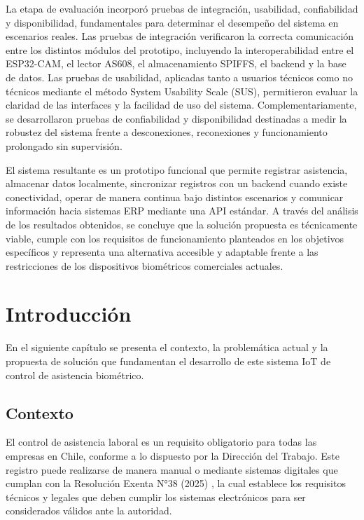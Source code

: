 \documentclass{iccmemoria}
\begin{document}
\begin{resumen}
La etapa de evaluación incorporó pruebas de integración, usabilidad, confiabilidad y disponibilidad, fundamentales para determinar el desempeño del sistema en escenarios reales. Las pruebas de integración verificaron la correcta comunicación entre los distintos módulos del prototipo, incluyendo la interoperabilidad entre el ESP32-CAM, el lector AS608, el almacenamiento SPIFFS, el backend y la base de datos. Las pruebas de usabilidad, aplicadas tanto a usuarios técnicos como no técnicos mediante el método System Usability Scale (SUS), permitieron evaluar la claridad de las interfaces y la facilidad de uso del sistema. Complementariamente, se desarrollaron pruebas de confiabilidad y disponibilidad destinadas a medir la robustez del sistema frente a desconexiones, reconexiones y funcionamiento prolongado sin supervisión.

El sistema resultante es un prototipo funcional que permite registrar asistencia, almacenar datos localmente, sincronizar registros con un backend cuando existe conectividad, operar de manera continua bajo distintos escenarios y comunicar información hacia sistemas ERP mediante una API estándar. A través del análisis de los resultados obtenidos, se concluye que la solución propuesta es técnicamente viable, cumple con los requisitos de funcionamiento planteados en los objetivos específicos y representa una alternativa accesible y adaptable frente a las restricciones de los dispositivos biométricos comerciales actuales.
\end{resumen}


\chapter{Introducción}
En el siguiente capítulo se presenta el contexto, la problemática actual y la propuesta de solución que fundamentan el desarrollo de este sistema IoT de control de asistencia biométrico.

\section{Contexto}
El control de asistencia laboral es un requisito obligatorio para todas las empresas en Chile, conforme a lo dispuesto por la Dirección del Trabajo. Este registro puede realizarse de manera manual o mediante sistemas digitales que cumplan con la Resolución Exenta N°38 (2025) \cite{dt_resolucion38}, la cual establece los requisitos técnicos y legales que deben cumplir los sistemas electrónicos para ser considerados válidos ante la autoridad.
\end{document}
